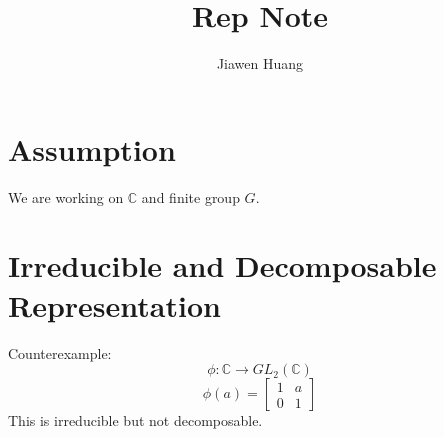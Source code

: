 \documentclass[15pt]{scrartcl}
\newcommand{\C}{\mathbb{C}}
\begin{document}
\title{Rep Note}
\date{}
\author{Jiawen Huang}
\maketitle
\section{Assumption}
We are working on $\C$ and finite group $G$. 
\section{Irreducible and Decomposable Representation}
Counterexample: 
\[\phi: \C\to GL_2(\C)\]
\[\phi(a)=\begin{bmatrix}
1 & a \\
0 & 1
\end{bmatrix}\]
This is irreducible but not decomposable. 
\end{document}
